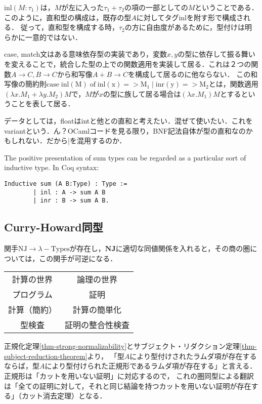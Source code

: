 \documentclass[uplatex, 12pt, dvipdfmx]{jsreport}
\begin{document}
\begin{remark}[どうしてこんなに記法がわかりにくいんだ．]
    $\mathrm{inl}(M:\tau_1)$は，$M$が左に入った$\tau_1+\tau_2$の項の一部としての$M$ということである．
    このように，直和型の構成は，既存の型$A$に対してタグinlを附す形で構成される．
    従って，直和型を構成する時，$\tau_2$の方に自由度があるために，型付けは明らかに一意的ではない．
    
    case, match文はある意味依存型の実装であり，変数$x,y$の型に依存して振る舞いを変えることで，統合した型の上での関数適用を実装して居る．これは２つの関数$A\to C,B\to C$から和写像$A+B\to C$を構成して居るのに他ならない．
    この和写像の簡約則$\mathrm{case\;inl(M)\;of\;inl(x)=>M_1\mid inr(y)=>M_2}$とは，関数適用$\left(\lambda x.M_1+\lambda y.M_2\right)M$で，$M$が$x$の型に族して居る場合は$(\lambda x.M_1)M$とするということを表して居る．

    データとしては，floatはintと他との直和と考えたい．混ぜて使いたい．これをvariantという．ん？OCamlコードを見る限り，BNF記法自体が型の直和なのかもしれない．だから$\mid$を混用するのか．
\end{remark}
\begin{example}
    The positive presentation of sum types can be regarded as a particular sort of inductive type. In Coq syntax:
    \begin{lstlisting}[caption=Coq]
        Inductive sum (A B:Type) : Type :=
        | inl : A -> sum A B
        | inr : B -> sum A B.
    \end{lstlisting}
\end{example}

\subsection{Curry-Howard同型}
関手$\mathrm{NJ}\to \lambda-\mathrm{Types}$が存在し，$\mathbf{NJ}$に適切な同値関係を入れると，その商の圏については，この関手が可逆になる．

\begin{table}[h]\centering
    \begin{tabular}{c|c}
        計算の世界 & 論理の世界\\
        プログラム & 証明\\
        計算（簡約） & 計算の簡単化\\
        型検査 & 証明の整合性検査
    \end{tabular}
\end{table}

正規化定理\ref{thm-strong-normalizability}とサブジェクト・リダクション定理\ref{thm-subject-reduction-theorem}より，
「型$A$により型付けされたラムダ項が存在するならば，型$A$により型付けられた正規形であるラムダ項が存在する」と言える．正規形は「カットを用いない証明」に対応するので，
これの圏同型による翻訳は「全ての証明に対して，それと同じ結論を持つカットを用いない証明が存在する」（カット消去定理）となる．
\end{document}
